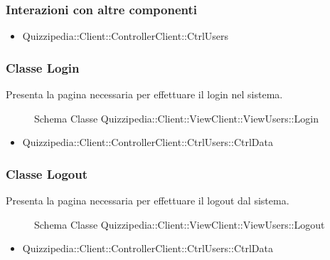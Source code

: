 \subsubsection{Interazioni con altre componenti}
\begin{itemize}
\item Quizzipedia::Client::ControllerClient::CtrlUsers
\end{itemize}
\subsubsection{Classe Login}
Presenta la pagina necessaria per effettuare il login nel sistema.
\begin{figure}[H]
\centering
\noindent{}
\caption{Schema Classe Quizzipedia::Client::ViewClient::ViewUsers::Login}
\end{figure}
\begin{itemize}
\item Quizzipedia::Client::ControllerClient::CtrlUsers::CtrlData
\end{itemize}
\subsubsection{Classe Logout}
Presenta la pagina necessaria per effettuare il logout dal sistema.
\begin{figure}[H]
\centering
\noindent{}
\caption{Schema Classe Quizzipedia::Client::ViewClient::ViewUsers::Logout}
\end{figure}
\begin{itemize}
\item Quizzipedia::Client::ControllerClient::CtrlUsers::CtrlData
\end{itemize}
